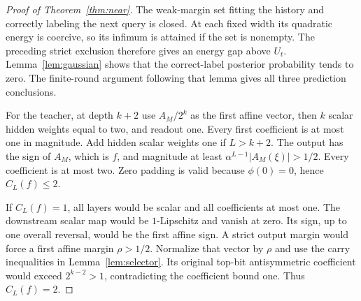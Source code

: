 \begin{proof}[Proof of Theorem~\ref{thm:near}]
The weak-margin set fitting the history and correctly labeling the
next query is closed. At each fixed width its quadratic energy is
coercive, so its infimum is attained if the set is nonempty.
The preceding strict exclusion therefore gives an energy gap above
$U_t$. Lemma~\ref{lem:gaussian} shows that the correct-label posterior
probability tends to zero. The finite-round argument following that
lemma gives all three prediction conclusions.

For the teacher, at depth $k+2$ use $A_M/2^k$ as the first affine vector,
then $k$ scalar hidden weights equal to two, and readout one.
Every first coefficient is at most one in magnitude. Add hidden scalar
weights one if $L>k+2$. The output has the sign of $A_M$, which is $f$,
and magnitude at least $\alpha^{L-1}|A_M(\xi)|>1/2$.
Every coefficient is at most two. Zero padding is valid because
$\phi(0)=0$, hence $C_L(f)\le2$.

If $C_L(f)=1$, all layers would be scalar and all coefficients at most
one. The downstream scalar map would be $1$-Lipschitz and vanish at zero.
Its sign, up to one overall reversal, would be the first affine sign.
A strict output margin would force a first affine margin $\rho>1/2$.
Normalize that vector by $\rho$ and use the carry inequalities in
Lemma~\ref{lem:selector}. Its original top-bit antisymmetric coefficient
would exceed $2^{k-2}>1$, contradicting the coefficient bound one.
Thus $C_L(f)=2$.
\end{proof}

